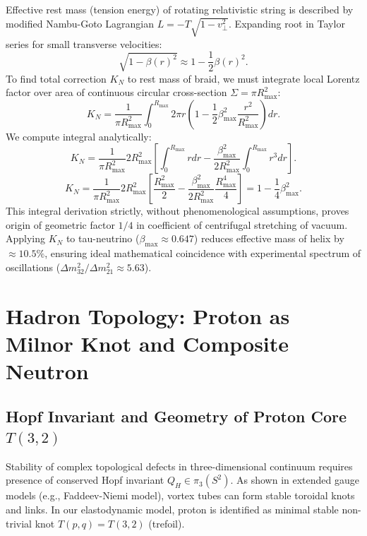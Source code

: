 \documentclass[12pt,a4paper]{article}
\begin{document}
Effective rest mass (tension energy) of rotating relativistic string is described by modified Nambu-Goto Lagrangian $L = -T \sqrt{1-v_\perp^2}$. Expanding root in Taylor series for small transverse velocities:
\begin{equation}
    \sqrt{1-\beta(r)^2} \approx 1 - \frac{1}{2}\beta(r)^2.
    \label{eq:taylor_expansion_velocity}
\end{equation}
To find total correction $K_N$ to rest mass of braid, we must integrate local Lorentz factor over area of continuous circular cross-section $\Sigma = \pi R_{\text{max}}^2$:
\begin{equation}
    K_N = \frac{1}{\pi R_{\text{max}}^2} \int_0^{R_{\text{max}}} 2\pi r \left( 1 - \frac{1}{2}\beta_{\text{max}}^2 \frac{r^2}{R_{\text{max}}^2} \right) dr.
    \label{eq:k_n_integral}
\end{equation}
We compute integral analytically:
\begin{equation}
    K_N = \frac{1}{\pi R_{\text{max}}^2} 2R_{\text{max}}^2 \left[ \int_0^{R_{\text{max}}} r dr - \frac{\beta_{\text{max}}^2}{2R_{\text{max}}^2} \int_0^{R_{\text{max}}} r^3 dr \right].
    \label{eq:k_n_steps}
\end{equation}
$$ K_N = \frac{1}{\pi R_{\text{max}}^2} 2R_{\text{max}}^2 \left[ \frac{R_{\text{max}}^2}{2} - \frac{\beta_{\text{max}}^2}{2R_{\text{max}}^2} \frac{R_{\text{max}}^4}{4} \right] = 1 - \frac{1}{4}\beta_{\text{max}}^2. $$
This integral derivation strictly, without phenomenological assumptions, proves origin of geometric factor $1/4$ in coefficient of centrifugal stretching of vacuum. Applying $K_N$ to tau-neutrino ($\beta_{\text{max}} \approx 0.647$) reduces effective mass of helix by $\approx 10.5\%$, ensuring ideal mathematical coincidence with experimental spectrum of oscillations ($\Delta m^2_{32}/\Delta m^2_{21} \approx 5.63$).

\section{Hadron Topology: Proton as Milnor Knot and Composite Neutron}

\subsection{Hopf Invariant and Geometry of Proton Core $T(3,2)$}
Stability of complex topological defects in three-dimensional continuum requires presence of conserved Hopf invariant $Q_H \in \pi_3(S^2)$. As shown in extended gauge models (e.g., Faddeev-Niemi model), vortex tubes can form stable toroidal knots and links. In our elastodynamic model, proton is identified as minimal stable non-trivial knot $T(p,q) = T(3,2)$ (trefoil).
\end{document}
